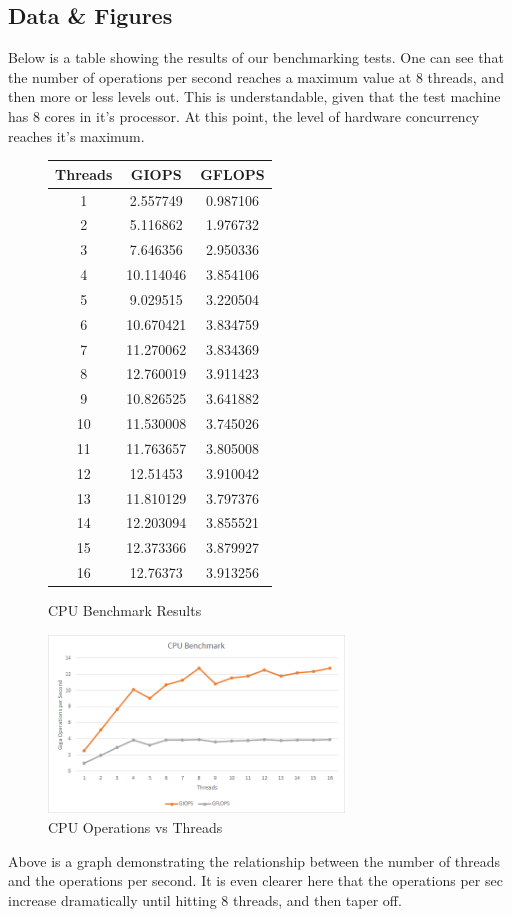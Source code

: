 \documentclass{article}
\begin{document}
\subsection{Data \& Figures}
Below is a table showing the results of our benchmarking tests.  One can see that the number of operations per second reaches a maximum value at 8 threads, and then more or less levels out.  This is understandable, given that the test machine has 8 cores in it's processor.  At this point, the level of hardware concurrency reaches it's maximum.
\begin{figure}[H]
	\centering
	\begin{tabular}{|c|c|c|}
		\hline
		Threads & GIOPS & GFLOPS \\
		\hline
		1 & 2.557749 & 0.987106 \\
		\hline
		2 &	5.116862 &	1.976732 \\
		\hline
		3 &	7.646356 &	2.950336 \\
		\hline
		4 &	10.114046 &	3.854106 \\
		\hline
		5 &	9.029515 &	3.220504 \\
		\hline
		6 &	10.670421 &	3.834759 \\
		\hline
		7 &	11.270062 &	3.834369 \\
		\hline
		8 &	12.760019 &	3.911423 \\
		\hline	
		9 &	10.826525 &	3.641882 \\
		\hline
		10 &	11.530008 &	3.745026 \\
		\hline
		11 &	11.763657 &	3.805008 \\
		\hline
		12 &	12.51453 &	3.910042 \\
		\hline
		13 &	11.810129 &	3.797376 \\
		\hline
		14 &	12.203094 &	3.855521 \\
		\hline
		15 &	12.373366 &	3.879927 \\
		\hline	
		16 &	12.76373 &	3.913256 \\
		\hline
	\end{tabular}
	\caption{CPU Benchmark Results}
\end{figure}

\begin{figure}[H]
	\centering
	\includegraphics[width=0.7\textwidth]{cpu_bench.png}
	\caption{CPU Operations vs Threads}
\end{figure}
Above is a graph demonstrating the relationship between the number of threads and the operations per second.  It is even clearer here that the operations per sec increase dramatically until hitting 8 threads, and then taper off.
\end{document}
